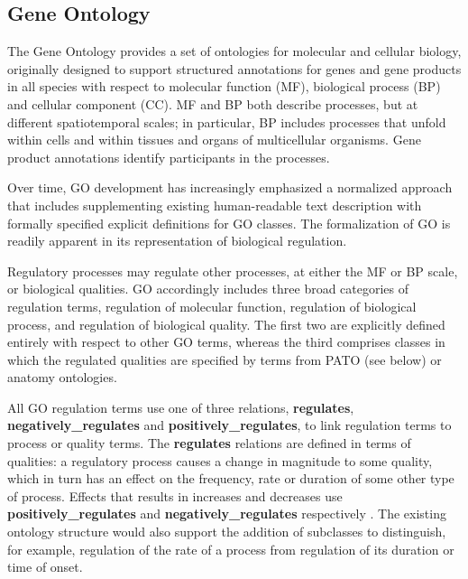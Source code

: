 \documentclass{bioinfo}
\renewcommand{\cite}{\citep}
\begin{document}

\subsection{Gene Ontology}
The Gene Ontology provides a set of ontologies for molecular and
cellular biology, originally designed to support structured
annotations for genes and gene products in all species with respect to
molecular function (MF), biological process (BP) and cellular
component (CC). MF and BP both describe processes, but at different
spatiotemporal scales; in particular, BP includes processes that
unfold within cells and within tissues and organs of multicellular
organisms. Gene product annotations identify participants in the
processes.

Over time, GO development has increasingly emphasized a normalized
approach that includes supplementing existing human-readable text
description with formally specified explicit definitions for GO
classes. The formalization of GO is readily apparent in its
representation of biological regulation.

Regulatory processes may regulate other processes, at either the MF or
BP scale, or biological qualities. GO accordingly includes three broad
categories of regulation terms, regulation of molecular function,
regulation of biological process, and regulation of biological
quality. The first two are explicitly defined entirely with respect to
other GO terms, whereas the third comprises classes in which the
regulated qualities are specified by terms from PATO (see below) or
anatomy ontologies.

All GO regulation terms use one of three relations, {\bf regulates},
{\bf negatively\_regulates} and {\bf positively\_regulates}, to link
regulation terms to process or quality terms. The {\bf regulates}
relations are defined in terms of qualities: a regulatory process
causes a change in magnitude to some quality, which in turn has an
effect on the frequency, rate or duration of some other type of
process. Effects that results in increases and decreases use {\bf
  positively\_regulates} and {\bf negatively\_regulates} respectively
\cite{Mungall2010go}. The existing ontology structure would also
support the addition of subclasses to distinguish, for example,
regulation of the rate of a process from regulation of its duration or
time of onset.
\end{document}
